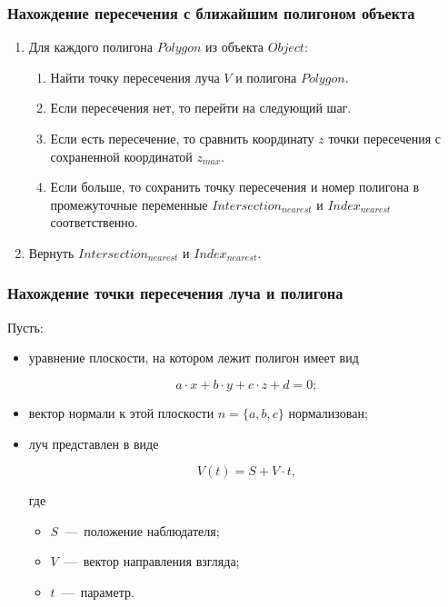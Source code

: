 \subsubsection{Нахождение пересечения с ближайшим полигоном объекта}

\begin{enumerate}
	\item Для каждого полигона $Polygon$ из объекта $Object$:
	\begin{enumerate}
		\item Найти точку пересечения луча $V$ и полигона $Polygon$.
		\item Если пересечения нет, то перейти на следующий шаг.
		\item Если есть пересечение, то сравнить координату $z$ точки пересечения с сохраненной координатой $z_{max}$.
		\item Если больше, то сохранить точку пересечения и номер полигона в промежуточные переменные $Intersection_{nearest}$ и $Index_{nearest}$ соответственно.
	\end{enumerate}
	\item Вернуть $Intersection_{nearest}$ и $Index_{nearest}$.
\end{enumerate}

\subsubsection{Нахождение точки пересечения луча и полигона}

Пусть:

\begin{itemize}
	\item уравнение плоскости, на котором лежит полигон имеет вид
	
	\begin{equation}
		a \cdot x + b \cdot y + c \cdot z + d = 0;
	\end{equation}
	
	\item вектор нормали к этой плоскости $n = \{a, b, c\}$ нормализован;
	\item луч представлен в виде
	
	\begin{equation}
		V(t) = S + V \cdot t,
	\end{equation}
	
	где 
		
		\begin{itemize}
			\item $S$~---~положение наблюдателя;
			\item $V$~---~вектор направления взгляда;
			\item $t$~---~параметр.
		\end{itemize}
\end{itemize}

